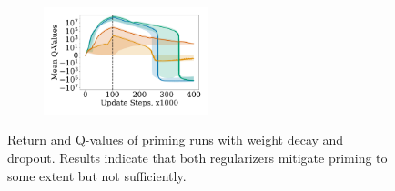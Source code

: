 \begin{figure}[t]
\begin{minipage}[b]{.62\textwidth}
\begin{subfigure}[b]{0.5\textwidth}
        \label{subfig:overestimation:priming_abl_ret}
    \end{subfigure}%
    \begin{subfigure}[b]{0.5\textwidth}
    \centering
        \includegraphics[width=4.8cm, trim=1cm 1cm 1cm 1cm ,clip]{figures/dissecting/priming/priming_ablations_Q.pdf}
        \label{subfig:overestimation:priming_abl_Q}
    \end{subfigure}%
    \caption{Return and
    Q-values of priming runs with weight decay and dropout. Results indicate that both regularizers mitigate priming to some extent but not sufficiently. }
    \label{fig:overestimationpriming_abl}
\end{minipage}
\end{figure}


